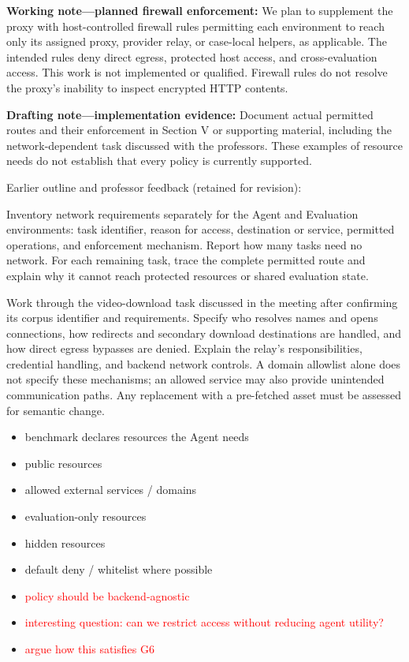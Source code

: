 \documentclass[conference]{IEEEtran}
\newcommand{\draft}[1]{%
    \par\noindent
    {\color{gray}\small #1}
    \par
}
\newcommand{\teacher}[1]{\textcolor{red}{#1}}
\newcommand{\secondtalk}[1]{{\color{secondtalkblue}#1}}
\begin{document}
\draft{\textbf{Working note---planned firewall enforcement:} We plan to supplement the proxy with host-controlled firewall rules permitting each environment to reach only its assigned proxy, provider relay, or case-local helpers, as applicable. The intended rules deny direct egress, protected host access, and cross-evaluation access. This work is not implemented or qualified. Firewall rules do not resolve the proxy's inability to inspect encrypted HTTP contents.}

\draft{\textbf{Drafting note---implementation evidence:} Document actual permitted routes and their enforcement in Section V or supporting material, including the network-dependent task discussed with the professors. These examples of resource needs do not establish that every policy is currently supported.}

\draft{Earlier outline and professor feedback (retained for revision):}
\draft{\secondtalk{Inventory network requirements separately for the Agent and Evaluation environments: task identifier, reason for access, destination or service, permitted operations, and enforcement mechanism. Report how many tasks need no network. For each remaining task, trace the complete permitted route and explain why it cannot reach protected resources or shared evaluation state.}}

\draft{\secondtalk{Work through the video-download task discussed in the meeting after confirming its corpus identifier and requirements. Specify who resolves names and opens connections, how redirects and secondary download destinations are handled, and how direct egress bypasses are denied. Explain the relay's responsibilities, credential handling, and backend network controls. A domain allowlist alone does not specify these mechanisms; an allowed service may also provide unintended communication paths. Any replacement with a pre-fetched asset must be assessed for semantic change.}}

\draft{
\begin{itemize}
    \item benchmark declares resources the Agent needs
    \item public resources
    \item allowed external services / domains
    \item evaluation-only resources
    \item hidden resources
    \item default deny / whitelist where possible
    \item \teacher{policy should be backend-agnostic}
    \item \teacher{interesting question: can we restrict access without reducing agent utility?}
    \item \teacher{argue how this satisfies G6}
\end{itemize}
}
\end{document}
